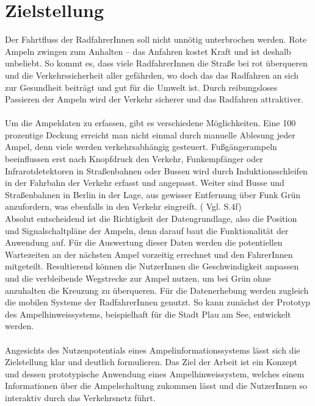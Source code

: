 \section{Zielstellung}
Der Fahrtfluss der RadfahrerInnen soll nicht unnötig unterbrochen werden. Rote Ampeln zwingen zum Anhalten -- das Anfahren kostet Kraft und ist deshalb unbeliebt. So kommt es, dass viele RadfahrerInnen die Straße bei rot überqueren und die Verkehrssicherheit aller gefährden, wo doch das das Radfahren an sich zur Gesundheit beiträgt und gut für die Umwelt ist. Durch reibungsloses Passieren der Ampeln wird der Verkehr sicherer und das Radfahren attraktiver.\\\\
Um die Ampeldaten zu erfassen, gibt es verschiedene Möglichkeiten. Eine 100 prozentige Deckung erreicht man nicht einmal durch manuelle Ablesung jeder Ampel, denn viele  werden verkehrsabhängig gesteuert. Fußgängerampeln beeinflussen erst nach Knopfdruck den Verkehr, Funkempfänger oder Infrarotdetektoren in Straßenbahnen oder Bussen wird durch Induktionsschleifen in der Fahrbahn der Verkehr erfasst und angepasst. Weiter sind Busse und Straßenbahnen in Berlin in der Lage, aus gewisser Entfernung über Funk Grün anzufordern, was ebenfalls in den Verkehr eingreift. ( Vgl. \cite{lsa_bln} S.4f) \\
Absolut entscheidend ist die Richtigkeit der Datengrundlage, also die Position und Signalschaltpläne der Ampeln, denn darauf baut die Funktionalität der Anwendung auf.
Für die Auswertung dieser Daten werden die potentiellen Wartezeiten an der nächsten Ampel vorzeitig errechnet und den FahrerInnen mitgeteilt. Resultierend können die NutzerInnen die Geschwindigkeit anpassen und die verbleibende Wegstrecke zur Ampel nutzen, um bei Grün ohne anzuhalten die Kreuzung zu überqueren. Für die Datenerhebung werden zugleich die mobilen Systeme der RadfahrerInnen genutzt. So kann zunächst der Prototyp des Ampelhinweissystems, beispielhaft für die Stadt Plau am See, entwickelt werden.\\\\
Angesichts des Nutzenpotentials eines Ampelinformationssystems lässt sich die Zielstellung klar und deutlich formulieren. Das Ziel der Arbeit ist ein Konzept und dessen prototypische Anwendung eines Ampelhinweissystem, welches einem Informationen über die Ampelschaltung zukommen lässt und die NutzerInnen so interaktiv durch das Verkehrsnetz führt.
%
%
